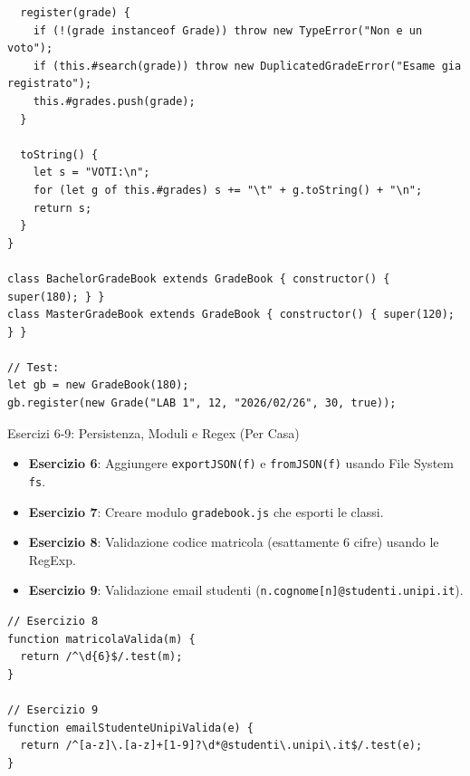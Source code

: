 \documentclass[12pt,a4paper]{article}
\begin{document}
\begin{solution}
\begin{lstlisting}
  register(grade) {
    if (!(grade instanceof Grade)) throw new TypeError("Non e un voto");
    if (this.#search(grade)) throw new DuplicatedGradeError("Esame gia registrato");
    this.#grades.push(grade);
  }

  toString() {
    let s = "VOTI:\n";
    for (let g of this.#grades) s += "\t" + g.toString() + "\n";
    return s;
  }
}

class BachelorGradeBook extends GradeBook { constructor() { super(180); } }
class MasterGradeBook extends GradeBook { constructor() { super(120); } }

// Test:
let gb = new GradeBook(180);
gb.register(new Grade("LAB 1", 12, "2026/02/26", 30, true));
\end{lstlisting}
\end{solution}

\begin{exercise}{Esercizi 6-9: Persistenza, Moduli e Regex (Per Casa)}
\begin{itemize}
    \item \textbf{Esercizio 6}: Aggiungere \texttt{exportJSON(f)} e \texttt{fromJSON(f)} usando File System \texttt{fs}.
    \item \textbf{Esercizio 7}: Creare modulo \texttt{gradebook.js} che esporti le classi.
    \item \textbf{Esercizio 8}: Validazione codice matricola (esattamente 6 cifre) usando le RegExp.
    \item \textbf{Esercizio 9}: Validazione email studenti (\texttt{n.cognome[n]@studenti.unipi.it}).
\end{itemize}
\end{exercise}

\begin{solution}
\begin{lstlisting}
// Esercizio 8
function matricolaValida(m) {
  return /^\d{6}$/.test(m);
}

// Esercizio 9
function emailStudenteUnipiValida(e) {
  return /^[a-z]\.[a-z]+[1-9]?\d*@studenti\.unipi\.it$/.test(e);
}
\end{lstlisting}
\end{solution}
\end{document}
